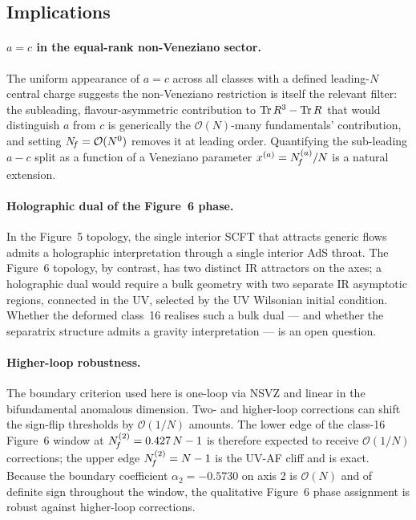 \subsection{Implications}

\paragraph{$a=c$ in the equal-rank non-Veneziano sector.}  The
uniform appearance of $a=c$ across all classes with a defined
leading-$N$ central charge suggests the non-Veneziano restriction is
itself the relevant filter: the
subleading, flavour-asymmetric contribution to $\operatorname{Tr} R^{3}-\operatorname{Tr} R$ that
would distinguish $a$ from $c$ is generically the
$\mathcal O(N)$-many fundamentals' contribution, and setting
$N_{\!f}=\mathcal O(N^{0})$ removes it at leading order.  Quantifying the
sub-leading $a-c$ split as a function of a Veneziano parameter
$x^{(a)}=N_{\!f}^{(a)}/N$ is a natural extension.

\paragraph{Holographic dual of the Figure~6 phase.}  In the Figure~5
topology, the single interior SCFT that attracts generic flows
admits a holographic interpretation through a single interior AdS
throat.  The Figure~6 topology, by contrast, has two distinct IR
attractors on the axes; a holographic dual would require a bulk
geometry with two separate IR asymptotic regions, connected in the
UV, selected by the UV Wilsonian initial condition.  Whether the
deformed class~16 realises such a bulk dual --- and whether the
separatrix structure admits a gravity interpretation --- is an open
question.

\paragraph{Higher-loop robustness.}  The boundary criterion used here
is one-loop via NSVZ and linear in the bifundamental anomalous
dimension.  Two- and higher-loop corrections can shift the
sign-flip thresholds by $\mathcal{O}(1/N)$ amounts.  The lower edge
of the class-16 Figure~6 window at $N_{\!f}^{(2)}=0.427\,N-1$ is
therefore expected to receive $\mathcal{O}(1/N)$ corrections; the
upper edge $N_{\!f}^{(2)}=N-1$ is the UV-AF cliff and is exact.  Because
the boundary coefficient $\alpha_{2}=-0.5730$ on axis 2 is
$\mathcal{O}(N)$ and of definite sign throughout the window, the
qualitative Figure~6 phase assignment is robust against higher-loop
corrections.

